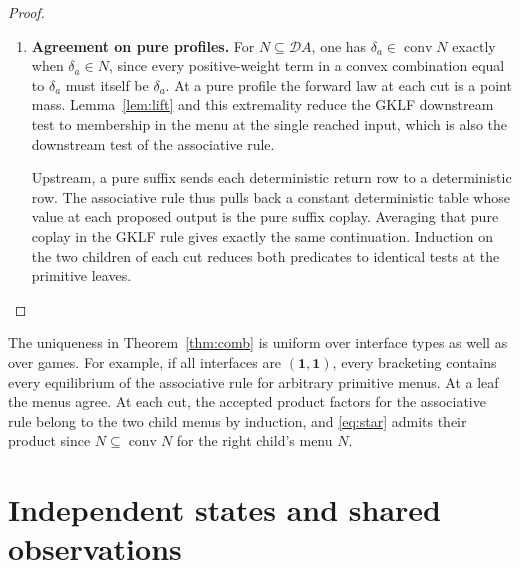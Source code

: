 \documentclass[11pt,a4paper]{article}
\theoremstyle{definition}
\newcommand{\D}{\mathcal D}
\newcommand{\conv}{\operatorname{conv}}
\newcommand{\one}{\mathbf 1}
\begin{document}
\begin{proof}
\begin{enumerate}[titledsteps]
        Each of $G,H,I$ has convex menus in every context. For $G;H$, the menu at a continuation $k'$ consists of the maximizers of the linear functional $p\mapsto\sum_y p(y)h_y(k'(y))$ paired with the unique middle strategy, and is again convex. The only remaining reduced subtree is $(G;H);I$, whose menu is a singleton at its sole context by Theorem~\ref{thm:reverse}. Induction from the leaves now shows that erasure preserves play, coplay and every menu.

        The reduced GKLF game selects the safe action. Identities also erase under the associative rule by Theorem~\ref{thm:direct}, and the sign calculation following Theorem~\ref{thm:chain} selects the risky action. Its equilibrium therefore witnesses the failure of inclusion for the chosen tree.

        \item \textbf{Agreement on pure profiles.} For $N\subseteq\D A$, one has $\delta_a\in\conv N$ exactly when $\delta_a\in N$, since every positive-weight term in a convex combination equal to $\delta_a$ must itself be $\delta_a$. At a pure profile the forward law at each cut is a point mass. Lemma~\ref{lem:lift} and this extremality reduce the GKLF downstream test to membership in the menu at the single reached input, which is also the downstream test of the associative rule.

        Upstream, a pure suffix sends each deterministic return row to a deterministic row. The associative rule thus pulls back a constant deterministic table whose value at each proposed output is the pure suffix coplay. Averaging that pure coplay in the GKLF rule gives exactly the same continuation. Induction on the two children of each cut reduces both predicates to identical tests at the primitive leaves.\qedhere
    \end{enumerate}
\end{proof}

The uniqueness in Theorem~\ref{thm:comb} is uniform over interface types as well as over games. For example, if all interfaces are $(\one,\one)$, every bracketing contains every equilibrium of the associative rule for arbitrary primitive menus. At a leaf the menus agree. At each cut, the accepted product factors for the associative rule belong to the two child menus by induction, and \eqref{eq:star} admits their product since $N\subseteq\conv N$ for the right child's menu $N$.

\section{Independent states and shared observations}\label{sec:signals}
\end{document}
